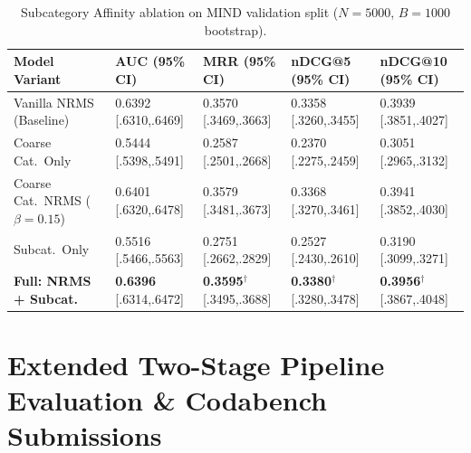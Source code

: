 \documentclass[11pt,a4paper]{article}
\begin{document}
\begin{table}[h!]
  \centering
  \caption{Subcategory Affinity ablation on MIND validation split ($N{=}5000$, $B{=}1000$ bootstrap).}
  \label{tab:affinity_mind}
  \vspace{-2pt}
  \small\setlength{\tabcolsep}{3pt}
  \begin{tabularx}{\linewidth}{l X X X X}
    \toprule
    \textbf{Model Variant} & \textbf{AUC (95\% CI)} & \textbf{MRR (95\% CI)} & \textbf{nDCG@5 (95\% CI)} & \textbf{nDCG@10 (95\% CI)} \\
    \midrule
    Vanilla NRMS (Baseline)            & 0.6392 [.6310,.6469] & 0.3570 [.3469,.3663] & 0.3358 [.3260,.3455] & 0.3939 [.3851,.4027] \\
    Coarse Cat.\ Only                  & 0.5444 [.5398,.5491] & 0.2587 [.2501,.2668] & 0.2370 [.2275,.2459] & 0.3051 [.2965,.3132] \\
    Coarse Cat.\ NRMS ($\beta{=}0.15$) & 0.6401 [.6320,.6478] & 0.3579 [.3481,.3673] & 0.3368 [.3270,.3461] & 0.3941 [.3852,.4030] \\
    Subcat.\ Only                      & 0.5516 [.5466,.5563] & 0.2751 [.2662,.2829] & 0.2527 [.2430,.2610] & 0.3190 [.3099,.3271] \\
    \textbf{Full: NRMS + Subcat.}      & \textbf{0.6396} [.6314,.6472] & \textbf{0.3595}$^\dagger$ [.3495,.3688] & \textbf{0.3380}$^\dagger$ [.3280,.3478] & \textbf{0.3956}$^\dagger$ [.3867,.4048] \\
    \bottomrule
  \end{tabularx}
\end{table}


\FloatBarrier

\section{Extended Two-Stage Pipeline Evaluation \& Codabench Submissions}
\label{sec:twostage_extended}
\label{sec:experiments}
\end{document}
